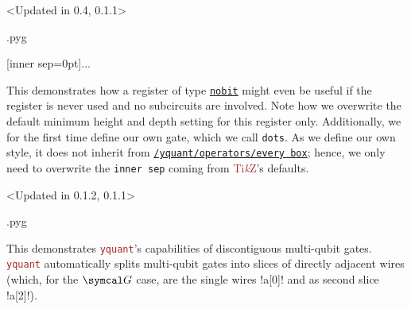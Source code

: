 \documentclass{scrartcl}
\makeatletter
\newenvironment{codeexample}{%
   \VerbatimEnvironment%
   \let\FVB@VerbatimOut\minted@FVB@VerbatimOut
   \let\FVE@VerbatimOut\minted@FVE@VerbatimOut
   \minted@configlang{tex}%
   \minted@fvset
   \begin{VerbatimOut}[codes={\catcode`\^^I=12},firstline,lastline]{\minted@jobname.pyg}%
}{
   \end{VerbatimOut}%
   \minted@langlinenoson%
   \savebox\codeexamplebox{ \minted@jobname.pyg}%
   \ifdim\wd\codeexamplebox>\dimexpr.5\linewidth-3mm\relax%
      \wd\codeexamplebox=.5\linewidth%
   \else%
      \wd\codeexamplebox=\dimexpr\wd\codeexamplebox+3mm\relax%
   \fi%
   \noindent\begin{minipage}{\wd\codeexamplebox}%
      \centering%
      \usebox\codeexamplebox%
   \end{minipage}%
   \begin{minipage}{\dimexpr\linewidth-\wd\codeexamplebox\relax}%
      \minted@pygmentize{\minted@lang}%
   \end{minipage}%
   \minted@langlinenosoff%
   \par%
}
\def\TikZ{\textcolor{brown}{Ti\textit kZ}}
\def\pkg#1{\textcolor{brown}{\texttt{#1}}}
\def\gate#1{\hyperref[gate:#1]{\texttt{#1}}}
\def\style#1{\hyperref[style:#1]{\texttt{#1}}}
\def\Yquant{\pkg{yquant}}
\makeatother
\begin{document}
               \begin{example}<Updated in 0.4, 0.1.1>
                  \begin{codeexample}
[inner sep=0pt]{$\dots$}
                  \end{codeexample}
                  This demonstrates how a register of type \gate{nobit} might even be useful if the register is never used and no subcircuits are involved.
                  Note how we overwrite the default minimum height and depth setting for this register only.
                  Additionally, we for the first time define our own gate, which we call \texttt{dots}.
                  As we define our own style, it does not inherit from \style{/yquant/operators/every box}; hence, we only need to overwrite the \texttt{inner sep} coming from \TikZ's defaults.
               \end{example}

               \clearpage
               \begin{example}<Updated in 0.1.2, 0.1.1>
                  \begin{codeexample}
                  \end{codeexample}
                  This demonstrates \Yquant's capabilities of discontiguous multi\hyp qubit gates.
                  \Yquant{} automatically splits multi\hyp qubit gates into slices of directly adjacent wires (which, for the $\symcal G$ case, are the single wires \yquant!a[0]! and as second slice \yquant!a[2]!).
               \end{example}
\end{document}
